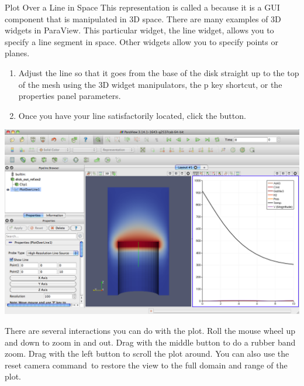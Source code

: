 \begin{exercise}{Plot Over a Line in Space}
  This representation is called a  because it is a GUI
  component that is manipulated in 3D space.  There are many examples of 3D
  widgets in ParaView.  This particular widget, the line widget, allows you
  to specify a line segment in space.  Other widgets allow you to specify
  points or planes.

  \begin{enumerate}
    \restorecounter
  \item Adjust the line so that it goes from the base of the disk straight up
    to the top of the mesh using the 3D widget manipulators, the p key
    shortcut, or the properties panel parameters.
  \item Once you have your line satisfactorily located, click the \apply
    button.
  \end{enumerate}

  \begin{inlinefig}
    \includegraphics[width=\scw]{images/LinePlot2}
  \end{inlinefig}

  There are several interactions you can do with the plot.  Roll the mouse 
  wheel up and down to zoom in and out.  Drag with the middle button
  to do a rubber band zoom.  Drag with the left button to scroll the plot
  around.  You can also use the reset camera command~\resetCamera to restore
  the view to the full domain and range of the plot.
\end{exercise}

